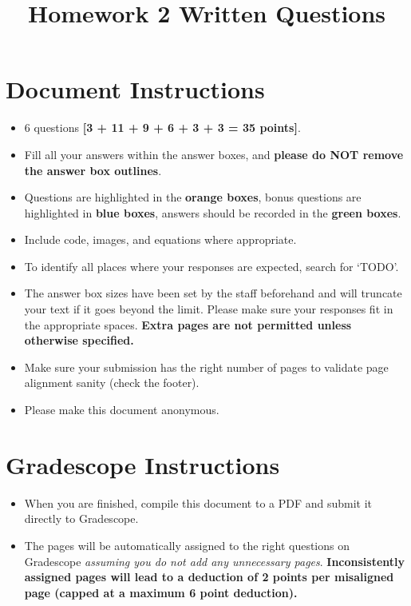 \documentclass[11pt]{article}
\date{}
\title{\vspace{-1cm}Homework 2 Written Questions}
\begin{document}
\maketitle
\vspace{-3cm}
\thispagestyle{fancy}


\section*{ Document Instructions}
\begin{itemize}
  \item 6 questions \textbf{[3 + 11 + 9 + 6 + 3 + 3 = 35 points]}.
  \item Fill all your answers within the answer boxes, and \textbf{please do NOT remove the answer box outlines}.
  \item Questions are highlighted in the \textbf{orange boxes}, bonus questions are highlighted in \textbf{blue boxes}, answers should be recorded in the \textbf{green boxes}.
  \item Include code, images, and equations where appropriate.
  \item To identify all places where your responses are expected, search for `TODO'.
  \item The answer box sizes have been set by the staff beforehand and will truncate your text if it goes beyond the limit. Please make sure your responses fit in the appropriate spaces. \textbf{Extra pages are not permitted unless otherwise specified.}
  \item Make sure your submission has the right number of pages to validate page alignment sanity (check the footer).
  \item Please make this document anonymous.
\end{itemize}

\section*{ Gradescope Instructions}
\begin{itemize}
  \item When you are finished, compile this document to a PDF and submit it directly to Gradescope. 
  \item The pages will be automatically assigned to the right questions on Gradescope \textit{assuming you do not add any unnecessary pages}. \textbf{Inconsistently assigned pages will lead to a deduction of 2 points per misaligned page (capped at a maximum 6 point deduction).}
\end{itemize}
\pagebreak
\end{document}
